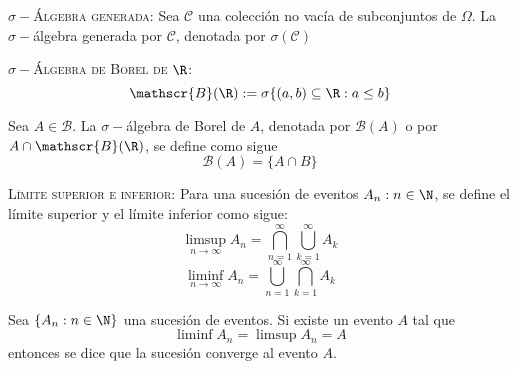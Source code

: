 \begin{definicion}
	{\scshape $\sigma -$Álgebra generada: } Sea $\mathscr{C}$ una colección no vacía de subconjuntos de $\Omega$. La $\sigma -$álgebra generada por $\mathscr{C}$, denotada por $\sigma (\mathscr{C})$
\end{definicion}

\begin{definicion}
	{\scshape $\sigma -$Álgebra de Borel de $\R$: } 
	$$\mathscr{B} (\R) := \sigma \{ (a,b) \subseteq \R:a\leq b \}$$
\end{definicion}

\begin{definicion}
	Sea $A \in \mathscr{B}$. La $\sigma -$álgebra de Borel de $A$, denotada por $\mathscr{B} (A)$  o por $A\cap \mathscr{B} (\R)$, se define como sigue
		$$\mathscr{B} (A) = \{ A\cap B \}$$
\end{definicion}

\begin{definicion}
	{\scshape Límite superior e inferior: } Para una sucesión de eventos $A_n : n\in \N$, se define el límite superior y el límite inferior como sigue:
	 	$$\limsup _{n\to \infty} A_n = \bigcap _{n=1} ^\infty \bigcup _{k=1} ^\infty A_k$$
	 	$$\liminf _{n\to \infty} A_n = \bigcup _{n=1} ^\infty \bigcap _{k=1} ^\infty A_k$$
\end{definicion}

\begin{definicion}
	Sea $\{ A_n : n\in \N \}$ una sucesión de eventos. Si existe un evento $A$ tal que
		$$\liminf A_n = \limsup A_n = A$$
	entonces se dice que la sucesión converge al evento $A$.
\end{definicion}






